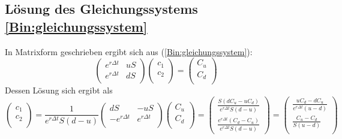 \subsection{Lösung des Gleichungssystems \ref{Bin:gleichungssystem} }
\label{Anhang:LGS}
In Matrixform geschrieben ergibt sich aus (\ref{Bin:gleichungssystem}):
\begin{equation*} \begin{pmatrix}
    e^{r\Delta t} & uS \\
    e^{r\Delta t} & dS \\
\end{pmatrix} 
\begin{pmatrix}
    c_1 \\
    c_2 \\
\end{pmatrix} = 
\begin{pmatrix}
    C_u \\
    C_d \\
\end{pmatrix}
\end{equation*}
Dessen Lösung sich ergibt als
\begin{equation*}
\begin{pmatrix}
    c_1 \\
    c_2 \\
\end{pmatrix} =
\frac{1}{e^{r\Delta t}S\left(d-u\right)}
\begin{pmatrix}
    dS &  -uS \\
    -e^{r\Delta t} & e^{r\Delta t} \\
\end{pmatrix}
\begin{pmatrix}
    C_u \\
    C_d \\
\end{pmatrix} = 
\begin{pmatrix}
\frac{S\left(dC_u - uC_d\right)}{e^{r\Delta t}S\left(d-u\right)} \\
\frac{e^{r\Delta t}\left(C_d-C_u\right)}{e^{r\Delta t}S\left(d-u\right)}
\end{pmatrix}=
\begin{pmatrix}
    \frac{uC_d - dC_u}{e^{r\Delta t}(u-d)} \\
    \frac{C_u - C_d}{S(u-d)} \\
\end{pmatrix}
\end{equation*}

